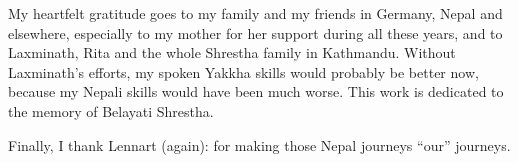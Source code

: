 \begin{refsection}
My heartfelt gratitude goes to my family and my friends in Germany, Nepal and elsewhere, especially to my mother for her support during all these years, and to Laxminath, Rita and the whole Shrestha family in Kathmandu. Without Laxminath's efforts, my spoken Yakkha skills would probably be better now, because my Nepali skills would have been much worse. This work is dedicated to the memory of Belayati Shrestha.  

Finally, I thank Lennart (again): for making those Nepal journeys  “our” journeys.





\printbibliography[heading=subbibliography]
\end{refsection}

